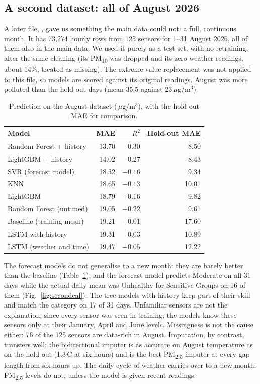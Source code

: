 \documentclass{ieeeaccess}
\newcommand{\ugm}{\,$\mu$g/m$^{3}$}
\newcommand{\pmtwo}{PM\textsubscript{2.5}}
\newcommand{\pmten}{PM\textsubscript{10}}
\begin{document}
\subsection{A second dataset: all of August 2026}
\label{sec:second}
A later file, , gave us something the main data could not: a full, continuous month. It has 73{,}274 hourly rows from 125 sensors for 1--31 August 2026, all of them also in the main data. We used it purely as a test set, with no retraining, after the same cleaning (its \pmten{} was dropped and its zero weather readings, about 14\%, treated as missing). The extreme-value replacement was not applied to this file, so models are scored against its original readings. August was more polluted than the hold-out days (mean 35.5 against 23\ugm).

\begin{table}[t]
\caption{Prediction on the August dataset (\ugm), with the hold-out MAE for comparison.}
\label{tab:second}
\centering
\small
\begin{tabular}{lrrr}
\toprule
Model & MAE & $R^2$ & Hold-out MAE \\
\midrule
Random Forest + history & 13.70 & 0.30 & 8.50 \\
LightGBM + history & 14.02 & 0.27 & 8.43 \\
SVR (forecast model) & 18.32 & $-0.16$ & 9.34 \\
KNN & 18.65 & $-0.13$ & 10.01 \\
LightGBM & 18.79 & $-0.16$ & 9.82 \\
Random Forest (untuned) & 19.05 & $-0.22$ & 9.61 \\
Baseline (training mean) & 19.21 & $-0.01$ & 17.60 \\
LSTM with history & 19.31 & 0.03 & 10.89 \\
LSTM (weather and time) & 19.47 & $-0.05$ & 12.22 \\
\bottomrule
\end{tabular}
\end{table}

The forecast models do not generalise to a new month: they are barely better than the baseline (Table~\ref{tab:second}), and the forecast model predicts Moderate on all 31 days while the actual daily mean was Unhealthy for Sensitive Groups on 16 of them (Fig.~\ref{fig:secondcal}). The tree models with history keep part of their skill and match the category on 17 of 31 days. Unfamiliar sensors are not the explanation, since every sensor was seen in training; the models know these sensors only at their January, April and June levels. Missingness is not the cause either: 76 of the 125 sensors are data-rich in August. Imputation, by contrast, transfers well: the bidirectional imputer is as accurate on August temperature as on the hold-out (1.3\,\textdegree C at six hours) and is the best \pmtwo{} imputer at every gap length from six hours up. The daily cycle of weather carries over to a new month; \pmtwo{} levels do not, unless the model is given recent readings.
\end{document}
